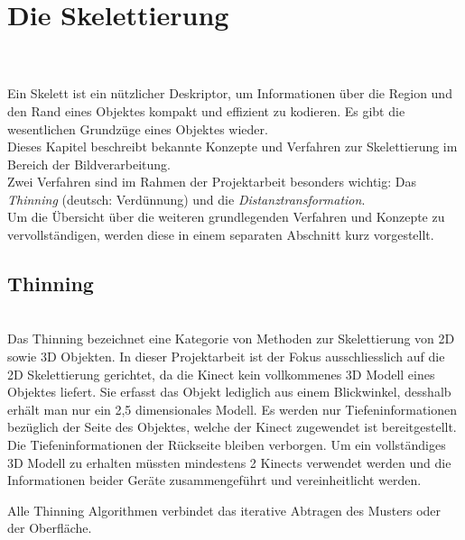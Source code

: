 \chapter{Die Skelettierung}
\\\\
Ein Skelett ist ein nützlicher Deskriptor, um Informationen über die Region und den Rand eines Objektes kompakt und effizient
zu kodieren. Es gibt die wesentlichen Grundzüge eines Objektes wieder.\\
Dieses Kapitel beschreibt bekannte Konzepte und Verfahren zur Skelettierung im Bereich der Bildverarbeitung.\\
Zwei Verfahren sind im Rahmen der Projektarbeit besonders wichtig: Das \emph{Thinning} (deutsch: Verdünnung) und die \emph{Distanztransformation}. \\
Um die Übersicht über die weiteren grundlegenden Verfahren und Konzepte zu vervollständigen, werden diese in einem separaten 
Abschnitt kurz vorgestellt.
\section{Thinning}
\\
Das Thinning bezeichnet eine Kategorie von Methoden zur Skelettierung von 2D sowie 3D Objekten. In dieser Projektarbeit ist der Fokus ausschliesslich auf die 2D Skelettierung gerichtet, da die Kinect kein vollkommenes 3D Modell eines Objektes liefert. Sie erfasst das Objekt lediglich aus einem Blickwinkel, desshalb erhält man nur ein 2,5 dimensionales Modell. Es werden nur Tiefeninformationen bezüglich der Seite des Objektes, welche der Kinect zugewendet ist bereitgestellt. Die  Tiefeninformationen der Rückseite bleiben verborgen. Um ein vollständiges 3D Modell zu erhalten müssten mindestens 2 Kinects verwendet werden und die Informationen beider Geräte zusammengeführt und vereinheitlicht werden. 

Alle Thinning Algorithmen verbindet das iterative Abtragen des Musters oder der Oberfläche.
\newpage
